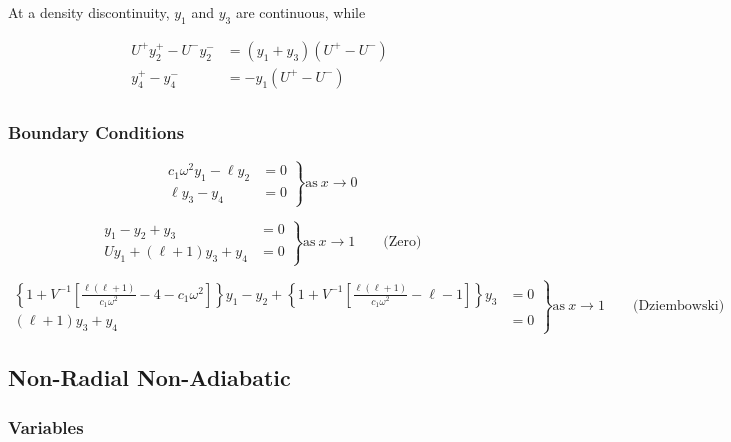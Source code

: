\documentclass[fleqn]{article}
\begin{document}
At a density discontinuity, $y_{1}$ and $y_{3}$ are continuous, while

\begin{align*}
U^{+} y_{2}^{+} - U^{-} y_{2}^{-} &= (y_{1} + y_{3}) (U^{+} - U^{-}) \\
y_{4}^{+} - y_{4}^{-} &= -y_{1} (U^{+} - U^{-}) \\
\end{align*}

\subsubsection*{Boundary Conditions}

\begin{equation*}
\left.
\begin{aligned}
c_{1} \omega^{2} y_{1} - \ell y_{2} &= 0 \\
\ell y_{3} - y_{4} &= 0
\end{aligned}
\right\}
\text{as}\ x \rightarrow 0
\end{equation*}

\begin{equation*}
\left.
\begin{aligned}
y_{1} - y_{2} + y_{3} &= 0 \\
U y_{1} + (\ell + 1) y_{3} + y_{4} &= 0
\end{aligned}
\right\}
\text{as}\ x \rightarrow 1 \qquad \text{(Zero)}
\end{equation*}

\begin{equation*}
\left.
\begin{aligned}
\left\{ 1 + V^{-1} \left[ \frac{\ell(\ell+1)}{c_{1} \omega^{2}} - 4 - c_{1} \omega^{2} \right] \right\} y_{1} -
y_{2} +
\left\{ 1 + V^{-1} \left[ \frac{\ell(\ell+1)}{c_{1} \omega^{2}} - \ell - 1 \right] \right\} y_{3} &= 0 \\
(\ell + 1) y_{3} + y_{4} &= 0
\end{aligned}
\right\} 
\text{as}\ x \rightarrow 1 \qquad \text{(Dziembowski)}
\end{equation*}


\newpage

\subsection*{Non-Radial Non-Adiabatic}

\subsubsection*{Variables}
\end{document}
